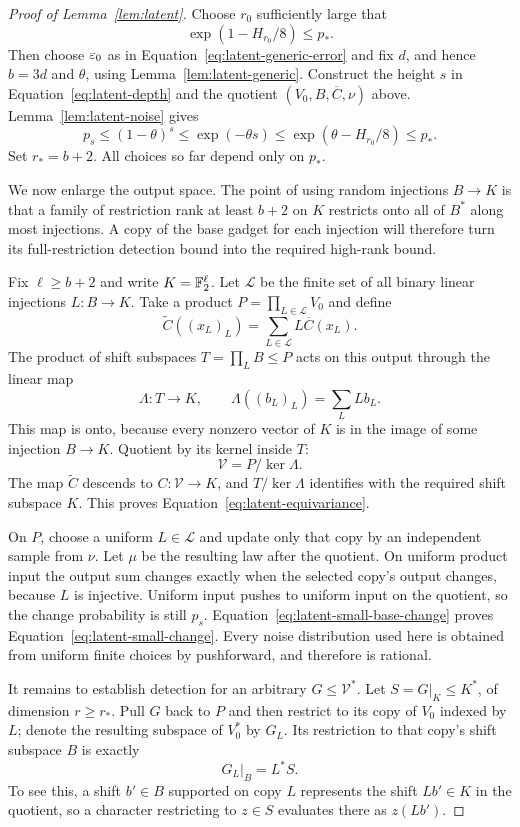 \begin{proof}[Proof of Lemma~\ref{lem:latent}]
Choose $r_0$ sufficiently large that
\[
 \exp(1-H_{r_0}/8)\le p_*.
\]
Then choose $\varepsilon_0$ as in Equation~\eqref{eq:latent-generic-error} and
fix $d$, and hence $b=3d$ and $\theta$, using
Lemma~\ref{lem:latent-generic}.  Construct the height $s$ in
Equation~\eqref{eq:latent-depth} and the quotient $(V_0,B,\overline C,\nu)$
above.  Lemma~\ref{lem:latent-noise} gives
\begin{equation}\label{eq:latent-small-base-change}
 p_s\le(1-\theta)^s
 \le\exp(-\theta s)
 \le\exp(\theta-H_{r_0}/8)
 \le p_*.
\end{equation}
Set $r_*=b+2$.  All choices so far depend only on $p_*$.

We now enlarge the output space.  The point of using random injections
$B\to K$ is that a family of restriction rank at least $b+2$ on $K$
restricts onto all of $B^*$ along most injections.  A copy of the base
gadget for each injection will therefore turn its full-restriction
detection bound into the required high-rank bound.

Fix $\ell\ge b+2$ and write $K=\mathbb F_2^\ell$.
Let $\mathcal L$ be the finite set of all binary linear injections
$L:B\to K$.  Take a product $P=\prod_{L\in\mathcal L}V_0$ and define
\[
 \widetilde C((x_L)_L)=\sum_{L\in\mathcal L}L\overline C(x_L).
\]
The product of shift subspaces $T=\prod_L B\le P$ acts on this output
through the linear map
\[
 \Lambda:T\longrightarrow K,
 \qquad \Lambda((b_L)_L)=\sum_L Lb_L.
\]
This map is onto, because every nonzero vector of $K$ is in the image of
some injection $B\to K$.  Quotient by its kernel inside $T$:
\[
 \mathcal V=P/\ker\Lambda.
\]
The map $\widetilde C$ descends to $C:\mathcal V\to K$, and
$T/\ker\Lambda$ identifies with the required shift subspace $K$.
This proves Equation~\eqref{eq:latent-equivariance}.

On $P$, choose a uniform $L\in\mathcal L$ and update only that copy by
an independent sample from $\nu$.  Let $\mu$ be the resulting law after
the quotient.  On uniform product input the output sum changes exactly
when the selected copy's output changes, because $L$ is injective.
Uniform input pushes to uniform input on the quotient, so the change
probability is still $p_s$.  Equation~\eqref{eq:latent-small-base-change}
proves Equation~\eqref{eq:latent-small-change}.  Every noise distribution
used here is obtained from uniform finite choices by pushforward, and
therefore is rational.

It remains to establish detection for an arbitrary
$G\le\mathcal V^*$.  Let $S=G|_K\le K^*$, of dimension $r\ge r_*$.
Pull $G$ back to $P$ and then restrict to its copy of $V_0$ indexed by
$L$; denote the resulting subspace of $V_0^*$ by $G_L$.
Its restriction to that copy's shift subspace $B$ is exactly
\[
 G_L|_B=L^*S.
\]
To see this, a shift $b'\in B$ supported on copy $L$ represents the
shift $Lb'\in K$ in the quotient, so a character restricting to
$z\in S$ evaluates there as $z(Lb')$.


\end{proof}
